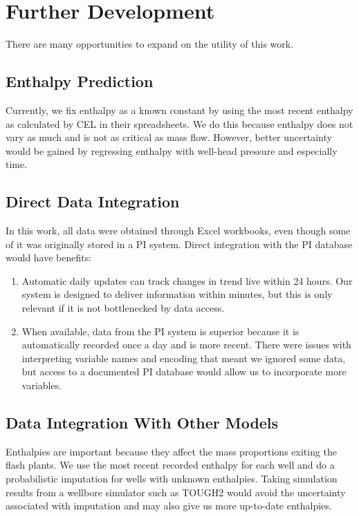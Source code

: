 \documentclass[a4paper, 12pt]{article}
\begin{document}

\section{Further Development}
There are many opportunities to expand on the utility of this work.

\subsection{Enthalpy Prediction}
Currently, we fix enthalpy as a known constant by using the most recent enthalpy as calculated by CEL in their spreadsheets. We do this because enthalpy does not vary as much and is not as critical as mass flow. However, better uncertainty would be gained by regressing enthalpy with well-head pressure and especially time.

\subsection{Direct Data Integration}
In this work, all data were obtained through Excel workbooks, even though some of it was originally stored in a PI system. Direct integration with the PI database would have benefits:

\begin{enumerate}
\item Automatic daily updates can track changes in trend live within 24 hours. Our system is designed to deliver information within minutes, but this is only relevant if it is not bottlenecked by data access.
\item When available, data from the PI system is superior because it is automatically recorded once a day and is more recent. There were issues with interpreting variable names and encoding that meant we ignored some data, but access to a documented PI database would allow us to incorporate more variables.
\end{enumerate}

\subsection{Data Integration With Other Models}
Enthalpies are important because they affect the mass proportions exiting the flash plants. We use the most recent recorded enthalpy for each well and do a probabilistic imputation for wells with unknown enthalpies. Taking simulation results from a wellbore simulator such as TOUGH2 would avoid the uncertainty associated with imputation and may also give us more up-to-date enthalpies.
\end{document}
